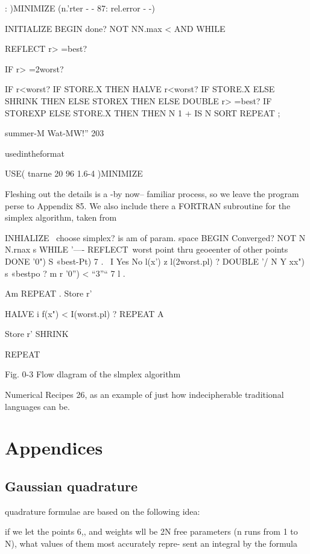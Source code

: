 : )MINIMIZE (n.'rter - - 87: rel.error - -)

INITIALIZE
BEGIN done? NOT NN.max < AND
WHILE

REFLECT r> =best?

IF r> =2worst?

IF r<worst? IF STORE.X THEN
HALVE r<worst?
IF STORE.X ELSE SHRINK THEN
ELSE STOREX THEN
ELSE DOUBLE r> =best?
IF STOREXP ELSE STORE.X THEN
THEN
N 1 + IS N SORT
REPEAT ;

summer-M Wat-MW!” 203

usedintheformat

USE( tnarne 20 96 1.6-4 )MINIMIZE

Fleshing out the details is a -by now-- familiar process, so we
leave the program perse to Appendix 85. We also include there
a FORTRAN subroutine for the simplex algorithm, taken from

 

 

 

INHIALIZE \ choose simplex? is am of param. space
BEGIN
Converged? NOT N N.rnax s
WHILE
'—- REFLECT\ worst point thru geoeenter of other points
DONE '0") S «best-Pt) 7
.~
I
Yes No l(x') z l(2worst.pl) ?
DOUBLE '/\’
N Y
xx") s «bestpo ? m r ’0”) < “3”“ 7
l .

Am REPEAT .
Store r'

HALVE
i
f(x") < I(worst.pl) ?
REPEAT A

Store r' SHRINK

REPEAT

 

 

Fig. 0-3 Flow dlagram of the slmplex algorithm


Numerical Recipes 26, as an example of just how indecipherable
traditional languages can be.

\section{Appendices}

\subsection{Gaussian quadrature}

 quadrature formulae are based on the following idea:

if we let the points 6,, and weights wll be 2N free parameters
(n runs from 1 to N), what values of them most accurately repre-
sent an integral by the formula

